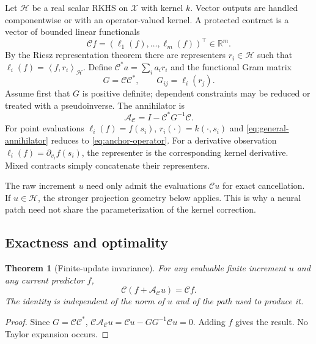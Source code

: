 \documentclass{vanish_ieee}
\newtheorem{theorem}{Theorem}
\theoremstyle{definition}
\newcommand{\Hcal}{\mathcal{H}}
\newcommand{\Aop}{\mathcal{A}}
\newcommand{\Cop}{\mathcal{C}}
\newcommand{\R}{\mathbb{R}}
\newcommand{\ip}[2]{\left\langle#1,#2\right\rangle}
\begin{document}
Let $\Hcal$ be a real scalar RKHS on $\mathcal{X}$ with kernel $k$.  Vector outputs are handled componentwise or with an operator-valued kernel.  A protected contract is a vector of bounded linear functionals
\begin{equation}
\Cop f=(\ell_1(f),\ldots,\ell_m(f))^\top\in\R^m.
\end{equation}
By the Riesz representation theorem there are representers $r_i\in\Hcal$ such that $\ell_i(f)=\ip{f}{r_i}_{\Hcal}$.  Define $\Cop^*a=\sum_i a_i r_i$ and the functional Gram matrix
\begin{equation}
G=\Cop\Cop^*,\qquad G_{ij}=\ell_i(r_j).
\end{equation}
Assume first that $G$ is positive definite; dependent constraints may be reduced or treated with a pseudoinverse.  The annihilator is
\begin{equation}
\boxed{\quad \Aop_{\Cop}=I-\Cop^*G^{-1}\Cop.\quad}
\label{eq:general-annihilator}
\end{equation}
For point evaluations $\ell_i(f)=f(s_i)$, $r_i(\cdot)=k(\cdot,s_i)$ and \eqref{eq:general-annihilator} reduces to \eqref{eq:anchor-operator}.  For a derivative observation $\ell_i(f)=\partial_{v_i}f(s_i)$, the representer is the corresponding kernel derivative.  Mixed contracts simply concatenate their representers.

The raw increment $u$ need only admit the evaluations $\Cop u$ for exact cancellation.  If $u\in\Hcal$, the stronger projection geometry below applies.  This is why a neural patch need not share the parameterization of the kernel correction.

\subsection{Exactness and optimality}

\begin{theorem}[Finite-update invariance]
For any evaluable finite increment $u$ and any current predictor $f$,
\begin{equation}
\Cop(f+\Aop_{\Cop}u)=\Cop f.
\end{equation}
The identity is independent of the norm of $u$ and of the path used to produce it.
\label{thm:finite}
\end{theorem}
\begin{proof}
Since $G=\Cop\Cop^*$,
$\Cop\Aop_{\Cop}u=\Cop u-GG^{-1}\Cop u=0$.
Adding $f$ gives the result.  No Taylor expansion occurs.
\end{proof}
\end{document}
